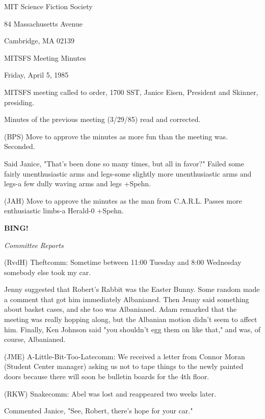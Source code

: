 \documentclass[12pt]{article}
\newcommand{\bing}{{\bf BING!} }
\newcommand{\goto}[1]{\bing \vskip 12pt \centerline{{\em{#1}}}}
\begin{document}
\begin{center}

MIT Science Fiction Society 

84 Massachusetts Avenue

Cambridge, MA 02139

\vspace{12pt}

MITSFS Meeting Minutes 

Friday, April 5, 1985

\end{center}
 
\vspace{18pt}

\setlength{\parskip}{6pt}

\noindent
MITSFS meeting called to order, 1700 SST,
Janice Eisen, President and Skinner, presiding.

Minutes of the previous meeting (3/29/85) read and corrected.

(BPS) Move to approve the minutes as more fun than the meeting was. Seconded.

Said Janice, "That's been done so many times, but all in favor?" Failed some fairly unenthusiastic arms and legs-some slightly more unenthusiastic arms and legs-a few dully waving arms and legs +Spehn.

(JAH) Move to approve the minutes as the man from C.A.R.L. Passes more enthusiastic limbs-a Herald-0 +Spehn.

\goto{Committee Reports}

(RvdH) Theftcomm: Sometime between 11:00 Tuesday and 8:00 Wednesday somebody else took my car.

Jenny suggested that Robert's Rabbit was the Easter Bunny. Some random made a comment that got him immediately Albanianed. Then Jenny said something about basket cases, and she too was Albanianed. Adam remarked that the meeting was really hopping along, but the Albanian motion didn't seem to affect him. Finally, Ken Johnson said "you shouldn't egg them on like that," and was, of course, Albanianed.

(JME) A-Little-Bit-Too-Latecomm: We received a letter from Connor Moran (Student Center manager) asking us not to tape things to the newly painted doors because there will soon be bulletin boards for the 4th floor.

(RKW) Snakecomm: Abel was lost and reappeared two weeks later.

Commented Janice, "See, Robert, there's hope for your car."
\end{document}
